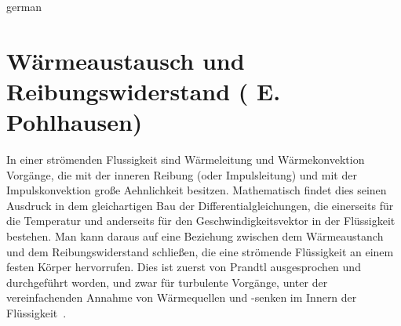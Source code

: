 \documentclass[captionpatch,colorlinks,upint,subscriptcorrection,varvw,german]{asmeconf}
\begin{document}
\begin{selectlanguage}{german}%
\section{Wärmeaustausch und Reibungswiderstand ( E. Pohlhausen)}\label{app:pohlhausen}
In einer strömenden Flussigkeit sind Wärmeleitung und Wärmekonvektion Vorgänge, die mit der inneren Reibung (oder Impulsleitung) und mit der Impulskonvektion große Aehnlichkeit besitzen. Mathematisch findet dies seinen Ausdruck in dem gleichartigen Bau der Differentialgleichungen, die einerseits für die Temperatur und anderseits für den Geschwindigkeitsvektor in der Flüssigkeit bestehen. Man kann daraus auf eine Beziehung
zwischen dem Wärmeaustanch und dem Reibungswiderstand schließen, die eine strömende Flüssigkeit an einem festen Körper hervorrufen. Dies ist zuerst von Prandtl ausgesprochen und durchgeführt worden, und zwar für turbulente Vorgänge, unter der vereinfachenden Annahme von Wärmequellen und -senken im Innern der Flüssigkeit~\cite{pohlhausen1921}. 
\end{selectlanguage}%

\end{document}
